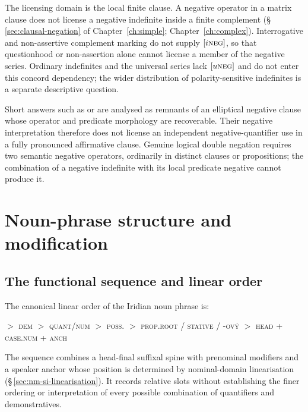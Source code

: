 The licensing domain is the local finite clause. A negative operator in a
matrix clause does not license a negative indefinite inside a finite
complement (§\,\ref{sec:clausal-negation} of
Chapter~\ref{ch:simple}; Chapter~\ref{ch:complex}). Interrogative 
and non-assertive complement marking do not supply $[i\textsc{neg}]$, so that questionhood
or non-assertion alone cannot license a member of the negative series.
Ordinary indefinites and the universal series lack $[u\textsc{neg}]$ and do not enter
this concord dependency; the wider distribution of polarity-sensitive
indefinites is a separate descriptive question.

Short answers such as  or  are analysed as remnants of an
elliptical negative clause whose operator and predicate morphology are
recoverable. Their negative interpretation therefore does not license an
independent negative-quantifier use in a fully pronounced affirmative clause.
Genuine logical double negation requires two semantic negative operators,
ordinarily in distinct clauses or propositions; the combination of a negative
indefinite with its local predicate negative cannot produce it.

\FloatBarrier

\section{Noun-phrase structure and modification}
\label{sec:nm-np-structure}

\subsection{The functional sequence and linear order}
\label{sec:nm-funcseq}

The canonical linear order of the Iridian noun phrase is:

\begin{center}
 $>$ \textsc{dem} $>$ \textsc{quant/num} $>$
\textsc{poss}.\Ind{} $>$ \textsc{prop.root / stative / -ový} $>$
\textsc{head} + \textsc{case.num} + \textsc{anch}
\end{center}

The sequence combines a head-final suffixal spine with prenominal
modifiers and a speaker anchor whose position is determined by nominal-domain
linearisation (§\,\ref{sec:nm-si-linearisation}). It records relative slots
without establishing the finer ordering or interpretation of every possible
combination of quantifiers and demonstratives.

